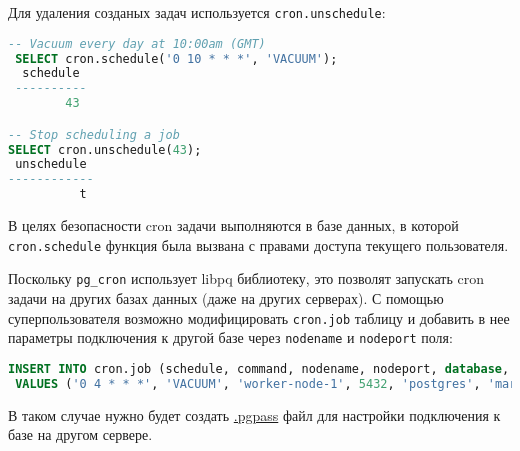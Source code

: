 Для удаления созданых задач используется \lstinline!cron.unschedule!:

\begin{lstlisting}[language=SQL,label=lst:pgcron4,caption=Cron.unschedule]
 -- Vacuum every day at 10:00am (GMT)
 SELECT cron.schedule('0 10 * * *', 'VACUUM');
  schedule
 ----------
        43

-- Stop scheduling a job
SELECT cron.unschedule(43);
 unschedule
------------
          t
\end{lstlisting}

В целях безопасности cron задачи выполняются в базе данных, в которой \lstinline!cron.schedule! функция была вызвана с правами доступа текущего пользователя.

Поскольку \lstinline!pg_cron! использует libpq библиотеку, это позволят запускать cron задачи на других базах данных (даже на других серверах). С помощью суперпользователя возможно модифицировать \lstinline!cron.job! таблицу и добавить в нее параметры подключения к другой базе через \lstinline!nodename! и \lstinline!nodeport! поля:

\begin{lstlisting}[language=SQL,label=lst:pgcron5,caption=Cron.job]
INSERT INTO cron.job (schedule, command, nodename, nodeport, database, username)
 VALUES ('0 4 * * *', 'VACUUM', 'worker-node-1', 5432, 'postgres', 'marco');
\end{lstlisting}

В таком случае нужно будет создать \href{https://www.postgresql.org/docs/current/static/libpq-pgpass.html}{.pgpass} файл для настройки подключения к базе на другом сервере.
